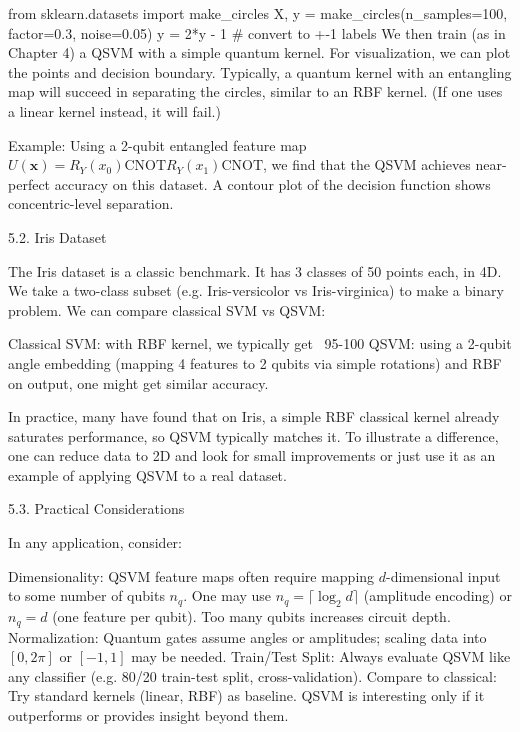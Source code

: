 from sklearn.datasets import make_circles
X, y = make_circles(n_samples=100, factor=0.3, noise=0.05)
y = 2*y - 1  # convert to +-1 labels
We then train (as in Chapter 4) a QSVM with a simple quantum kernel.  For visualization, we can plot the points and decision boundary.  Typically, a quantum kernel with an entangling map will succeed in separating the circles, similar to an RBF kernel.  (If one uses a linear kernel instead, it will fail.)



Example: Using a 2-qubit entangled feature map $U(\mathbf{x})=R_Y(x_0)\text{CNOT} R_Y(x_1)\text{CNOT}$, we find that the QSVM achieves near-perfect accuracy on this dataset.  A contour plot of the decision function shows concentric-level separation.





5.2. Iris Dataset





The Iris dataset is a classic benchmark.  It has 3 classes of 50 points each, in 4D.  We take a two-class subset (e.g. Iris-versicolor vs Iris-virginica) to make a binary problem.  We can compare classical SVM vs QSVM:



Classical SVM: with RBF kernel, we typically get ~95-100%
QSVM: using a 2-qubit angle embedding (mapping 4 features to 2 qubits via simple rotations) and RBF on output, one might get similar accuracy.




In practice, many have found that on Iris, a simple RBF classical kernel already saturates performance, so QSVM typically matches it.  To illustrate a difference, one can reduce data to 2D and look for small improvements or just use it as an example of applying QSVM to a real dataset.





5.3. Practical Considerations





In any application, consider:



Dimensionality: QSVM feature maps often require mapping $d$-dimensional input to some number of qubits $n_q$.  One may use $n_q=\lceil \log_2 d\rceil$ (amplitude encoding) or $n_q=d$ (one feature per qubit).  Too many qubits increases circuit depth.
Normalization: Quantum gates assume angles or amplitudes; scaling data into $[0,2\pi]$ or $[-1,1]$ may be needed.
Train/Test Split: Always evaluate QSVM like any classifier (e.g. 80/20 train-test split, cross-validation).
Compare to classical: Try standard kernels (linear, RBF) as baseline.  QSVM is interesting only if it outperforms or provides insight beyond them.




